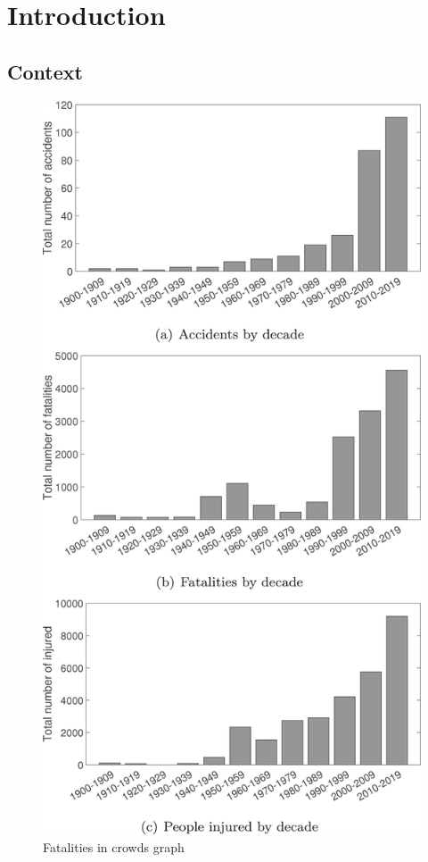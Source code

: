 \documentclass[
]{article}
\begin{document}
\newpage{}

\hypertarget{introduction}{%
\section{Introduction}\label{introduction}}

\hypertarget{context}{%
\subsection{Context}\label{context}}

\begin{figure}

{\centering \includegraphics{../images/fatalities.jpg}

}

\caption{\label{fig-fatalities}Fatalities in crowds graph
\autocite[Figure from][]{FELICIANI2023106174}}

\end{figure}
\end{document}
